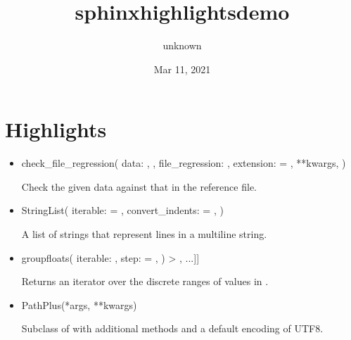 \documentclass[letterpaper,10pt,english]{sphinxmanual}
\title{sphinx\sphinxhyphen{}highlights\sphinxhyphen{}demo}
\date{Mar 11, 2021}
\author{unknown}
\begin{document}
\pagestyle{empty}
\sphinxmaketitle
\pagestyle{plain}
\sphinxtableofcontents
\pagestyle{normal}
\label{\detokenize{index::doc}}



\chapter{Highlights}
\label{\detokenize{index:highlights}}\label{\detokenize{index:sphinx-highlights-0}}\begin{itemize}
\item {}
\begin{sphinxalltt}
check\_file\_regression(
  data: \sphinxcode{\sphinxupquote{Union}}{[}, \sphinxcode{\sphinxupquote{StringList}}{]},
  file\_regression: ,
  extension:  = ,
  **kwargs,
  )
\end{sphinxalltt}

Check the given data against that in the reference file.

\item {}
\begin{sphinxalltt}
StringList(
  iterable: \sphinxcode{\sphinxupquote{Iterable}}{[}\sphinxcode{\sphinxupquote{String}}{]} = \sphinxcode{\sphinxupquote{()}},
  convert\_indents:  = ,
  )
\end{sphinxalltt}

A list of strings that represent lines in a multiline string.

\item {}
\begin{sphinxalltt}
groupfloats(
  iterable: \sphinxcode{\sphinxupquote{Iterable}}{[}\sphinxcode{\sphinxupquote{float}}{]},
  step:  = ,
  ) \sphinxhyphen{}\textgreater{} \sphinxcode{\sphinxupquote{Iterable}}{[}\sphinxcode{\sphinxupquote{Tuple}}{[}, ...{]}{]}
\end{sphinxalltt}

Returns an iterator over the discrete ranges of values in .

\item {}
\begin{sphinxalltt}
PathPlus(*args, **kwargs)
\end{sphinxalltt}

Subclass of  with additional methods and a default encoding of UTF\sphinxhyphen{}8.

\end{itemize}



\renewcommand{\indexname}{Index}
\printindex
\end{document}
